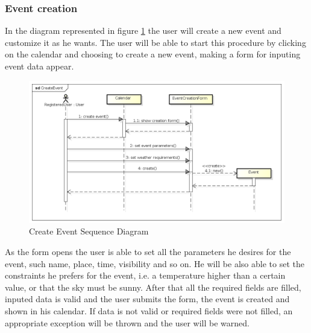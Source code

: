 \subsubsection{Event creation}
In the diagram represented in figure \ref{fig:createseqdiag} the user will create a new event and customize it as he wants. The user will be able to start this procedure by clicking on the calendar and choosing to create a new event, making a form for inputing event data appear.
\begin{center}
 \begin{figure}[H]
    \includegraphics[width=1\textwidth]{../UMLDiagram/sequence/CreateEvent/CreateEvent.png}
    \caption{Create Event Sequence Diagram}
     \label{fig:createseqdiag}
     \end{figure}
   \end{center}
As the form opens the user is able to set all the parameters he desires for the event, such name, place, time, visibility and so on. He will be also able to set the constraints he prefers for the event, i.e. a temperature higher than a certain value, or that the sky must be sunny. After that all the required fields are filled, inputed data is valid and the user submits the form, the event is created and shown in his calendar. If data is not valid or required fields were not filled, an appropriate exception will be thrown and the user will be warned.
